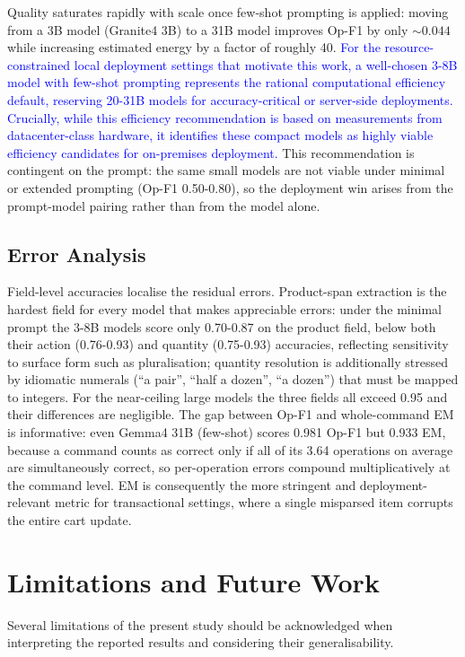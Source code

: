 \documentclass[journal,article,submit,pdftex,moreauthors]{Definitions/mdpi}
\begin{document}
Quality saturates rapidly with scale once few-shot prompting is applied: moving from a 3B model (Granite4 3B) to a 31B model improves Op-F1 by only ${\sim}0.044$ while increasing estimated energy by a factor of roughly 40. \textcolor{blue}{For the resource-constrained local deployment settings that motivate this work, a well-chosen 3-8B model with few-shot prompting represents the rational computational efficiency default, reserving 20-31B models for accuracy-critical or server-side deployments. Crucially, while this efficiency recommendation is based on measurements from datacenter-class hardware, it identifies these compact models as highly viable efficiency candidates for on-premises deployment.} This recommendation is contingent on the prompt: the same small models are not viable under minimal or extended prompting (Op-F1 0.50-0.80), so the deployment win arises from the prompt-model pairing rather than from the model alone.

\subsection{Error Analysis}

Field-level accuracies localise the residual errors. Product-span extraction is the hardest field for every model that makes appreciable errors: under the minimal prompt the 3-8B models score only 0.70-0.87 on the product field, below both their action (0.76-0.93) and quantity (0.75-0.93) accuracies, reflecting sensitivity to surface form such as pluralisation; quantity resolution is additionally stressed by idiomatic numerals (``a pair'', ``half a dozen'', ``a dozen'') that must be mapped to integers. For the near-ceiling large models the three fields all exceed 0.95 and their differences are negligible. The gap between Op-F1 and whole-command EM is informative: even Gemma4 31B (few-shot) scores 0.981 Op-F1 but 0.933 EM, because a command counts as correct only if all of its 3.64 operations on average are simultaneously correct, so per-operation errors compound multiplicatively at the command level. EM is consequently the more stringent and deployment-relevant metric for transactional settings, where a single misparsed item corrupts the entire cart update.

\section{Limitations and Future Work}\label{sec:limitations}
Several limitations of the present study should be acknowledged when interpreting the reported results and considering their generalisability.
\end{document}

